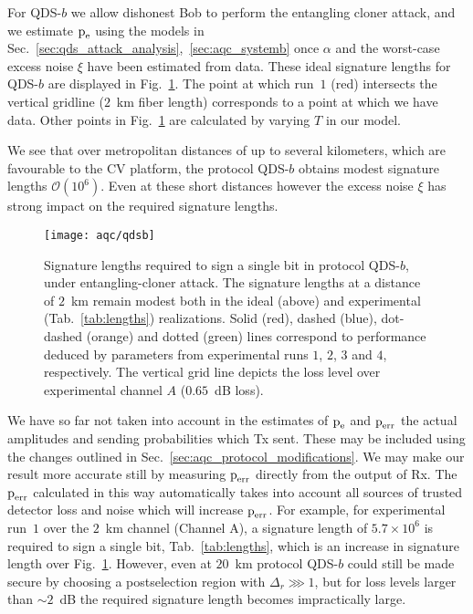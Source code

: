 For QDS-$b$ we allow dishonest Bob to perform the entangling cloner attack, and we estimate $\text{p}_{\text{e}}$ using the models in Sec.~\ref{sec:qds_attack_analysis},~\ref{sec:aqc_systemb} once $\alpha$ and the worst-case excess noise $\xi$ have been estimated from data. These ideal signature lengths for QDS-$b$ are displayed in Fig.~\ref{fig:aqc_qdsb}. The point at which run~$1$ (red) intersects the vertical gridline ($2$~km fiber length) corresponds to a point at which we have data. Other points in Fig.~\ref{fig:aqc_qdsb} are calculated by varying $T$ in our model.

We see that over metropolitan distances of up to several kilometers, which are favourable to the CV platform, the protocol QDS-$b$ obtains modest signature lengths $\mathcal{O}\left(10^6\right)$. Even at these short distances however the excess noise $\xi$ has strong impact on the required signature lengths.

\begin{figure}[htp]
\captionsetup{width=\linewidth}
\centering
\texttt{[image: aqc/qdsb]}
\caption{\label{fig:aqc_qdsb} Signature lengths required to sign a single bit in protocol QDS-$b$, under entangling-cloner attack. The signature lengths at a distance of $2$~km remain modest both in the ideal (above) and experimental (Tab.~\ref{tab:lengths}) realizations. %
Solid (red), dashed (blue), dot-dashed (orange) and dotted (green) lines correspond to performance deduced by parameters from experimental runs $1$, $2$, $3$ and $4$, respectively. The vertical grid line depicts the loss level over experimental channel $A$ ($0.65$~dB loss).}
\end{figure} %

We have so far not taken into account in the estimates of $\text{p}_{\text{e}}$ and $\text{p}_{\text{err}}$ the actual amplitudes and sending probabilities which Tx sent. These may be included using the changes outlined in Sec.~\ref{sec:aqc_protocol_modifications}. We may make our result more accurate still by measuring $\text{p}_{\text{err}}$ directly from the output of Rx. The $\text{p}_{\text{err}}$ calculated in this way automatically takes into account all sources of trusted detector loss and noise which will increase $\text{p}_{\text{err}}$. For example, for experimental run~$1$ over the $2$~km channel (Channel A), a signature length of $5.7 \times 10^6$ is required to sign a single bit, Tab.~\ref{tab:lengths}, which is an increase in signature length over Fig.~\ref{fig:aqc_qdsb}. However, even at $20$~km protocol QDS-$b$ could still be made secure by choosing a postselection region with $\Delta_r \ggg 1$, but for loss levels larger than $\sim 2$~dB the required signature length becomes impractically large.

